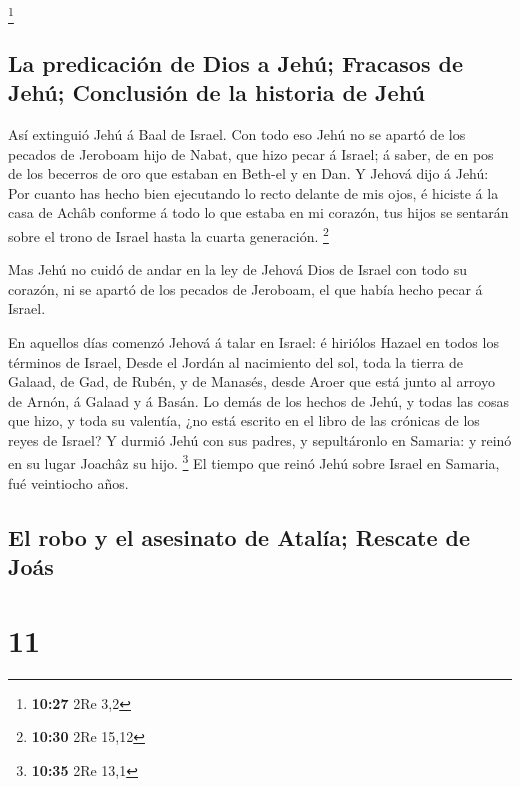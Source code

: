 \footnote{\textbf{10:27} 2Re 3,2}

\hypertarget{la-predicaciuxf3n-de-dios-a-jehuxfa-fracasos-de-jehuxfa-conclusiuxf3n-de-la-historia-de-jehuxfa}{%
\subsection{La predicación de Dios a Jehú; Fracasos de Jehú; Conclusión
de la historia de
Jehú}\label{la-predicaciuxf3n-de-dios-a-jehuxfa-fracasos-de-jehuxfa-conclusiuxf3n-de-la-historia-de-jehuxfa}}

 Así extinguió Jehú á Baal de Israel.  Con
todo eso Jehú no se apartó de los pecados de Jeroboam hijo de Nabat, que
hizo pecar á Israel; á saber, de en pos de los becerros de oro que
estaban en Beth-el y en Dan.  Y Jehová dijo á Jehú: Por
cuanto has hecho bien ejecutando lo recto delante de mis ojos, é hiciste
á la casa de Achâb conforme á todo lo que estaba en mi corazón, tus
hijos se sentarán sobre el trono de Israel hasta la cuarta generación.
\footnote{\textbf{10:30} 2Re 15,12}

 Mas Jehú no cuidó de andar en la ley de Jehová Dios de
Israel con todo su corazón, ni se apartó de los pecados de Jeroboam, el
que había hecho pecar á Israel.

 En aquellos días comenzó Jehová á talar en Israel: é
hiriólos Hazael en todos los términos de Israel,  Desde
el Jordán al nacimiento del sol, toda la tierra de Galaad, de Gad, de
Rubén, y de Manasés, desde Aroer que está junto al arroyo de Arnón, á
Galaad y á Basán.  Lo demás de los hechos de Jehú, y
todas las cosas que hizo, y toda su valentía, ¿no está escrito en el
libro de las crónicas de los reyes de Israel?  Y durmió
Jehú con sus padres, y sepultáronlo en Samaria: y reinó en su lugar
Joachâz su hijo. \footnote{\textbf{10:35} 2Re 13,1}  El
tiempo que reinó Jehú sobre Israel en Samaria, fué veintiocho años.

\hypertarget{el-robo-y-el-asesinato-de-ataluxeda-rescate-de-jouxe1s}{%
\subsection{El robo y el asesinato de Atalía; Rescate de
Joás}\label{el-robo-y-el-asesinato-de-ataluxeda-rescate-de-jouxe1s}}

\hypertarget{section-10}{%
\section{11}\label{section-10}}


